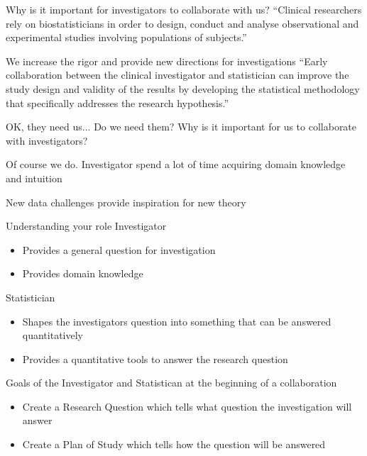 \documentclass[14pt]{beamer}
\begin{document}
\begin{frame}{Why is it important for investigators to collaborate 
with us?}
``Clinical researchers rely on biostatisticians in order to design, conduct and 
analyse observational and experimental studies involving populations of 
subjects.'' \citep{Bangdiwala2001}
\end{frame}

\begin{frame}{We increase the rigor and provide new directions
for investigations}
``Early collaboration between the clinical investigator and statistician can 
improve the study design and validity of the results by developing the 
statistical methodology that specifically addresses the research hypothesis.''
\cite{Adams2009}
\end{frame}

\begin{frame}{OK, they need us...  Do we need them?}
Why is it important for us to collaborate with investigators?
\end{frame}

\begin{frame}{Of course we do.}
Investigator spend a lot of time acquiring domain knowledge and intuition

\vspace{0.5cm}

New data challenges provide inspiration for new theory
\end{frame}

\begin{frame}{Understanding your role}
Investigator
\begin{itemize}
\item Provides a general question for investigation
\item Provides domain knowledge
\end{itemize}
Statistician
\begin{itemize}
\item Shapes the investigators question into something that can be answered
  quantitatively
\item Provides a quantitative tools to answer the research question
\end{itemize}
\end{frame}

\begin{frame}{Goals of the Investigator and Statistican at the beginning of
a collaboration}
\begin{itemize}
\item Create a Research Question which tells what question the investigation 
  will answer
\item Create a Plan of Study which tells how the question will be answered
\end{itemize}
\end{frame}
\end{document}
